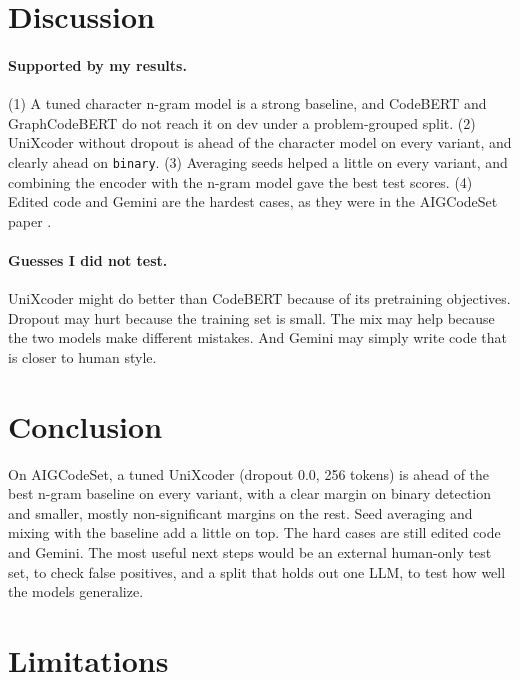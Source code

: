 \documentclass[11pt]{article}
\begin{document}
\section{Discussion}
\label{sec:discussion}

\paragraph{Supported by my results.}
(1) A tuned character n-gram model is a strong baseline, and CodeBERT and GraphCodeBERT do not reach it on dev under a problem-grouped split. (2) UniXcoder without dropout is ahead of the character model on every variant, and clearly ahead on \texttt{binary}. (3) Averaging seeds helped a little on every variant, and combining the encoder with the n-gram model gave the best test scores. (4) Edited code and Gemini are the hardest cases, as they were in the AIGCodeSet paper \citep{demirok-kutlu-2025-aigcodeset}.

\paragraph{Guesses I did not test.}
UniXcoder might do better than CodeBERT because of its pretraining objectives. Dropout may hurt because the training set is small. The mix may help because the two models make different mistakes. And Gemini may simply write code that is closer to human style.

\section{Conclusion}
\label{sec:conclusion}

On AIGCodeSet, a tuned UniXcoder (dropout 0.0, 256 tokens) is ahead of the best n-gram baseline on every variant, with a clear margin on binary detection and smaller, mostly non-significant margins on the rest. Seed averaging and mixing with the baseline add a little on top. The hard cases are still edited code and Gemini. The most useful next steps would be an external human-only test set, to check false positives, and a split that holds out one LLM, to test how well the models generalize.

\section*{Limitations}
\end{document}
